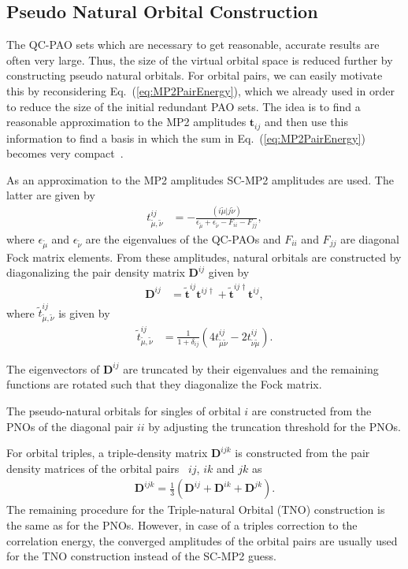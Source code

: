 \subsection{Pseudo Natural Orbital Construction}

The QC-PAO sets which are necessary to get reasonable, accurate results are often very large. Thus, the size of the
virtual orbital space is reduced further by constructing pseudo natural orbitals. For orbital pairs, we can easily
motivate this by reconsidering Eq.~(\ref{eq:MP2PairEnergy}), which we already used in order to reduce the size of
the initial redundant PAO sets. The idea is to find a reasonable approximation to the MP2 amplitudes $\pmb{t}_{ij}$
and then use this information to find a basis in which the sum in Eq.~(\ref{eq:MP2PairEnergy}) becomes very
compact~\cite{Neese2009b}.

As an approximation to the MP2 amplitudes SC-MP2 amplitudes are used. The latter are given by
\begin{align}
  t^{ij}_{\tilde{\mu},\tilde{\nu}} &= -\frac{(i\tilde{\mu}|j\tilde{\nu})}{{\epsilon_{\tilde{\mu}}}+{\epsilon_{\tilde{\nu}}}-F_{ii}-F_{jj}},
\end{align}
where $\epsilon_{\tilde{\mu}}$ and $\epsilon_{\tilde{\nu}}$ are the eigenvalues of the QC-PAOs and $F_{ii}$ and $F_{jj}$
are diagonal Fock matrix elements.
From these amplitudes, natural orbitals are constructed by diagonalizing the pair density matrix $\pmb{D}^{ij}$ given
by
\begin{align}
  \mathbf{D}^{ij} &= \tilde{\mathbf{t}}^{ij}\mathbf{t}^{ij\dagger} + \tilde{\mathbf{t}}^{ij\dagger}\mathbf{t}^{ij},
\end{align}
where $\tilde{t}^{ij}_{\tilde{\mu},\tilde{\nu}}$ is given by
\begin{align}
  \tilde{t}^{ij}_{\tilde{\mu},\tilde{\nu}}  &= \frac{1}{1+\delta_{ij}}(4t^{ij}_{\tilde{\mu}\tilde{\nu}}-2t^{ij}_{\tilde{\nu}\tilde{\mu}}).
\end{align}

The eigenvectors of $\mathbf{D}^{ij}$ are truncated by their eigenvalues and the remaining functions are
rotated such that they diagonalize the Fock matrix.

The pseudo-natural orbitals for singles of orbital $i$ are constructed from the PNOs of the
diagonal pair $ii$ by adjusting the truncation threshold for the PNOs.

For orbital triples, a triple-density matrix $\mathbf{D}^{ijk}$ is constructed from the pair density matrices
of the orbital pairs~\cite{Riplinger2013a} $ij$, $ik$ and $jk$ as
\begin{align}
  \mathbf{D}^{ijk} = \frac{1}{3} \left( \mathbf{D}^{ij} + \mathbf{D}^{ik} +\mathbf{D}^{jk} \right).
\end{align}
The remaining procedure for the Triple-natural Orbital (TNO) construction is the same as for the PNOs.
However, in case of a triples correction to the correlation energy, the converged amplitudes of the orbital
pairs are usually used for the TNO construction instead of the SC-MP2 guess.
